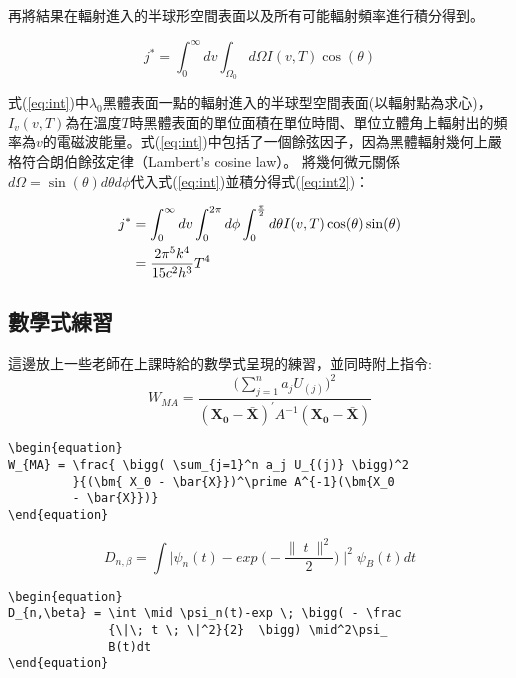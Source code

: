 \documentclass[12pt, a4paper]{article}
\begin{document}
再將結果在輻射進入的半球形空間表面以及所有可能輻射頻率進行積分得到。

\begin{equation} \label{eq:int}
j^* = \int^\infty_0 dv \int^{}_{\Omega_{0}} d\Omega I(v,T)\cos(\theta)
\end{equation}

式(\ref{eq:int})中$\lambda_0$黑體表面一點的輻射進入的半球型空間表面(以輻射點為求心)，$I_{v}(v,T)$為在溫度$T$時黑體表面的單位面積在單位時間、單位立體角上輻射出的頻率為$v$的電磁波能量。式(\ref{eq:int})中包括了一個餘弦因子，因為黑體輻射幾何上嚴格符合朗伯餘弦定律（Lambert's cosine law）。
將幾何微元關係$d \Omega = \sin(\theta)d \theta d \phi$代入式(\ref{eq:int})並積分得式(\ref{eq:int2})：

\textcolor{blue(pigment)}{
\begin{align} \label{eq:int2}
j^* &= \int^\infty_0 dv \int^{2 \pi}_0 d \phi \int^{\frac{\pi}{2}}_0 d \theta I(v,T) \cos(\theta) \sin(\theta) \notag \\ %
    &= \frac{2 \pi^5 k^4}{15 c^2 h^3} T^4
\end{align}}

\subsection{數學式練習}
這邊放上一些老師在上課時給的數學式呈現的練習，並同時附上指令:
\begin{equation}
W_{MA} = \frac{ \bigg( \sum_{j=1}^n a_j U_{(j)} \bigg)^2 }{ ( \bm{ X_0 - \bar{X}} )^\prime  A^{-1} ( \bm{X_0 - \bar{X}} ) }
\end{equation}
\begin{lstlisting}
\begin{equation}
W_{MA} = \frac{ \bigg( \sum_{j=1}^n a_j U_{(j)} \bigg)^2 
         }{(\bm{ X_0 - \bar{X}})^\prime A^{-1}(\bm{X_0 
         - \bar{X}})}
\end{equation}
\end{lstlisting}

\begin{equation}
D_{n,\beta} = \int \mid \psi_n(t)-exp \; \bigg( - \frac{\| \; t \; \|^2}{2}  \bigg) \mid^2 \psi_B(t)dt
\end{equation}
\begin{lstlisting}
\begin{equation}
D_{n,\beta} = \int \mid \psi_n(t)-exp \; \bigg( - \frac
              {\|\; t \; \|^2}{2}  \bigg) \mid^2\psi_
              B(t)dt
\end{equation}
\end{lstlisting}
\end{document}

